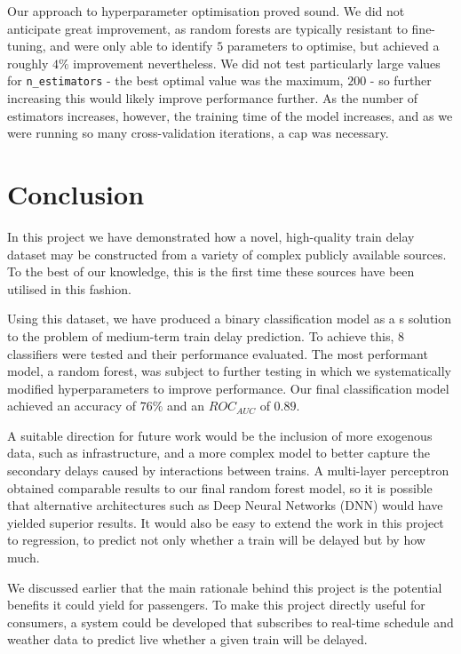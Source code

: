 \documentclass[12pt,a4paper]{article}
\begin{document}
Our approach to hyperparameter optimisation proved sound. We did not anticipate great improvement, as random forests are typically resistant to fine-tuning, and were only able to identify $5$ parameters to optimise, but achieved a roughly $4\%$ improvement nevertheless. We did not test particularly large values for \verb|n_estimators| - the best optimal value was the maximum, $200$ - so further increasing this would likely improve performance further. As the number of estimators increases, however, the training time of the model increases, and as we were running so many cross-validation iterations, a cap was necessary. 

\section{Conclusion}

In this project we have demonstrated how a novel, high-quality train delay dataset may be constructed from a variety of complex publicly available sources. To the best of our knowledge, this is the first time these sources have been utilised in this fashion.  

Using this dataset, we have produced a binary classification model as a s solution to the problem of medium-term train delay prediction. To achieve this, $8$ classifiers were tested and their performance evaluated. The most performant model, a random forest, was subject to further testing in which we systematically modified hyperparameters to improve performance. Our final classification model achieved an accuracy of $76\%$ and an $ROC_{AUC}$ of $0.89$. 

A suitable direction for future work would be the inclusion of more exogenous data, such as infrastructure, and a more complex model to better capture the secondary delays caused by interactions between trains. A multi-layer perceptron obtained comparable results to our final random forest model, so it is possible that alternative architectures such as Deep Neural Networks (DNN) would have yielded superior results. It would also be easy to extend the work in this project to regression, to predict not only whether a train will be delayed but by how much.

We discussed earlier that the main rationale behind this project is the potential benefits it could yield for passengers. To make this project directly useful for consumers, a system could be developed that subscribes to real-time schedule and weather data to predict live whether a given train will be delayed.
\clearpage

\end{document}
